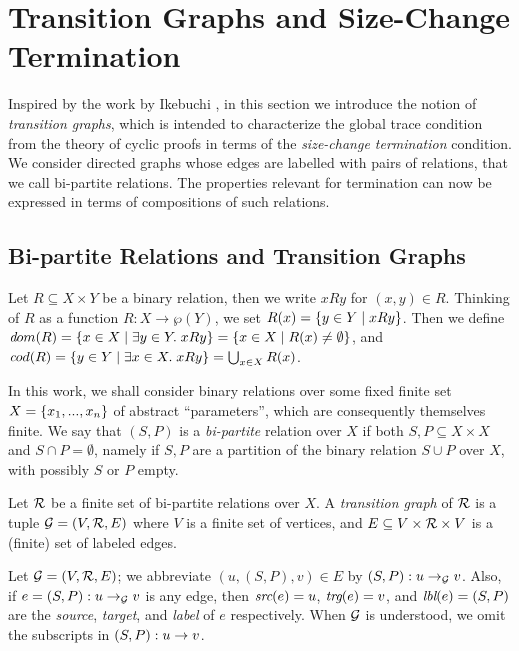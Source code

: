 \section{Transition Graphs and Size-Change Termination}
\label{sec:size-change}


Inspired by the work by Ikebuchi \cite{Mirai}, in this section we introduce the notion of {\em transition graphs}, which is intended to characterize the global trace condition from the theory of cyclic proofs in terms of the {\em size-change termination} condition. We consider directed graphs whose edges are labelled with pairs of relations, that we call bi-partite relations. The properties relevant for termination can now be expressed in terms of compositions of such relations.
 
 \subsection{Bi-partite Relations and Transition Graphs}
 
Let $R \subseteq X \times Y$ be a binary relation, then we write $x R y$ for $(x,y) \in R$. 
Thinking of $R$ as a function $R: X \to \wp(Y)$, we set $R(x) = \{ y \in Y \mid x R y \}$. 
Then we define ${\textit dom}( R ) = \{ x \in X \mid \exists y \in Y.\; xRy \} 
= \{ x \in X \mid R(x) \neq \emptyset \}$, and
${\textit cod}( R ) = \{ y \in Y \mid \exists x \in X.\; xRy \} = \bigcup_{x \in X} R(x)$. 

In this work, we shall consider binary relations over some fixed finite set 
$X = \{ x_1, ..., x_n \}$ of abstract ``parameters'', which are consequently themselves finite. We say that $(S,P)$ is a {\em bi-partite} relation over $X$ if both $S, P \subseteq X \times X$ and $S \cap P = \emptyset$, namely if $S, P$ are a partition of the binary relation $S \cup P$ over $X$, with possibly $S$ or $P$ empty.

\begin{definition}\label{def:transitionGraph}
Let $\mathcal{R}$ be a finite set of bi-partite relations over $X$.
A {\em transition graph} of $\mathcal{R}$ is a tuple $\mathcal{G} = (V, \mathcal{R}, E)$ where $V$ is a finite set of vertices, and $E \subseteq V \times \mathcal{R}\times V$ is a (finite) set of labeled edges.
\end{definition}

Let $\mathcal{G} = (V, \mathcal{R}, E)$; we abbreviate $(u, (S,P), v) \in E$ by $(S,P) : u \to_{\mathcal{G}} v$.
Also, if $e = (S,P) : u \to_{\mathcal{G}} v$ is any edge, 
then $\textit{src}( e ) = u$, $\textit{trg}( e ) = v$, and $\textit{lbl}( e ) = (S,P)$ are the {\em source}, {\em target}, and {\em label}
of $e$ respectively. When $\mathcal{G}$ is understood, we omit the subscripts in $(S,P) : u \to v$. 

